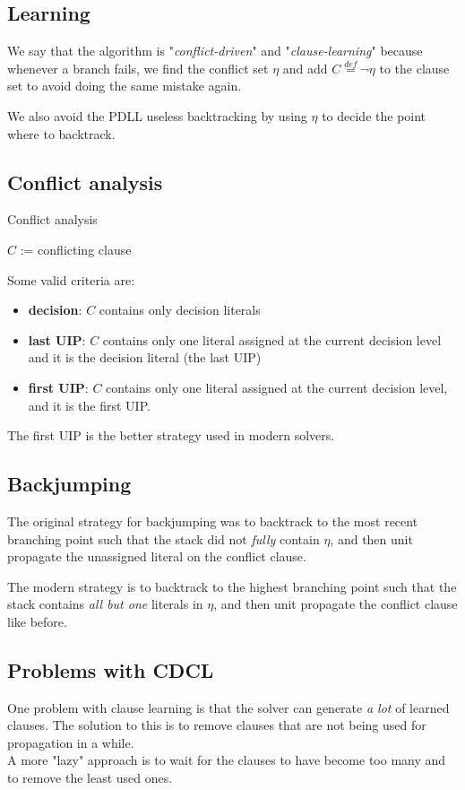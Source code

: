 \documentclass{article}
\begin{document}
\subsection{Learning}
We say that the algorithm is "\textit{conflict-driven}" and "\textit{clause-learning}" because whenever a branch fails, we find the conflict set $\eta$ and add $C\overset{def}=\neg\eta$ to the clause set to avoid doing the same mistake again.

We also avoid the PDLL useless backtracking by using $\eta$ to decide the point where to backtrack.

\subsection{Conflict analysis}
\begin{algorithm}[ht]
    \caption{Conflict analysis}
    $C$ := conflicting clause\;
\end{algorithm}
Some valid criteria are:
\begin{itemize}
    \item \textbf{decision}: $C$ contains only decision literals
    \item \textbf{last UIP}: $C$ contains only one literal assigned at the current decision level and it is the decision literal (the last UIP)
    \item \textbf{first UIP}: $C$ contains only one literal assigned at the current decision level, and it is the first UIP.
\end{itemize}
The first UIP is the better strategy used in modern solvers.

\subsection{Backjumping}
The original strategy for backjumping was to backtrack to the most recent branching point such that the stack did not \textit{fully} contain $\eta$, and then unit propagate the unassigned literal on the conflict clause.

The modern strategy is to backtrack to the highest branching point such that the stack contains \textit{all but one} literals in $\eta$, and then unit propagate the conflict clause like before.

\subsection{Problems with CDCL}
One problem with clause learning is that the solver can generate \textit{a lot} of learned clauses. The solution to this is to remove clauses that are not being used for propagation in a while.\\
A more "lazy" approach is to wait for the clauses to have become too many and to remove the least used ones.
\end{document}
